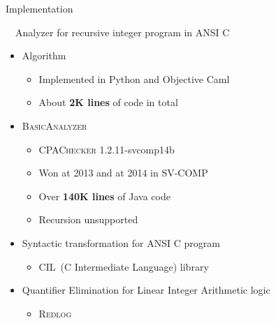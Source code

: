 
\begin{frame}{Implementation}

  {\large \ \ Analyzer for recursive integer program in ANSI C \\}
\begin{itemize}
  \item Algorithm
  \begin{itemize}
    \item Implemented in Python and Objective Caml
    \item About \textbf{2K lines} of code in total
  \end{itemize}

  \item \textsc{BasicAnalyzer}
  \begin{itemize}
    \item \textsc{CPAChecker} 1.2.11-svcomp14b
    \item Won  at 2013 and  at 2014 in SV-COMP
    \item Over \textbf{140K lines} of Java code
    \item Recursion unsupported
  \end{itemize}

  \item Syntactic transformation for ANSI C program
  \begin{itemize}
    \item CIL~(C Intermediate Language) library
  \end{itemize}

  \item Quantifier Elimination for Linear Integer Arithmetic logic
  \begin{itemize}
    \item \textsc{Redlog}
  \end{itemize}
\end{itemize}
\end{frame}

